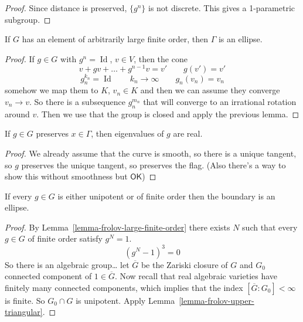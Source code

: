 \begin{proof}
Since distance is preserved, $\{g^n\}$ is not
discrete. This gives a 1-parametric subgroup.
\end{proof}

\begin{lemma}
\label{lemma-frolov-large-finite-order}
If $G$ has an element of arbitrarily large
finite order, then $\Gamma$ is an ellipse.
\end{lemma}

\begin{proof}
If $g \in G$ with $g^n=\operatorname{Id}$, $v
\in V$, then the cone
$$v+gv+\ldots +g^{n-1}v=v'\qquad g(v')=v'$$
$$g^{k_n}_n=\operatorname{Id}\qquad k_n\to
\infty\qquad g_n(v_n)=v_n$$
somehow we map them to $K$, $v_n\in K$ and
then we can assume they converge $v_n\to v$.
So there is a subsequence $g_n^{m_n}$ that
will converge to an irrational rotation
around $v$. Then we use that the group is
closed and apply the previous lemma.
\end{proof}

\begin{lemma}
\label{lemma-frolov-real-eigenvalues}
If $g \in G$ preserves $x\in \Gamma$, then
eigenvalues of $g$ are real.
\end{lemma}

\begin{proof}
We already assume that the curve is smooth,
so there is a unique tangent, so $g$
preserves the unique tangent, so preserves
the flag. (Also there's a way to show this
without smoothness but $\mathsf{OK}$)
\end{proof}

\begin{lemma}
\label{lemma-frolov-unipotent-or-finite}
If every $g \in G$ is either unipotent or of
finite order then the boundary is an ellipse.
\end{lemma}

\begin{proof}
By
Lemma~\ref{lemma-frolov-large-finite-order}
there exists $N$ such that every $g\in G$ of
finite order satisfy $g^N=1$.
$$(g^N-1)^3=0$$
So there is an algebraic group… let
$\overline{G}$ be the Zariski closure of $G$
and $G_0$ connected component of $1\in
\overline{G}$. Now recall that real algebraic
varieties have finitely many connected
components, which implies that the index
$[\overline{G}:G_0]<\infty$ is finite. So
$G_0\cap G$ is unipotent. Apply
Lemma~\ref{lemma-frolov-upper-triangular}.
\end{proof}

